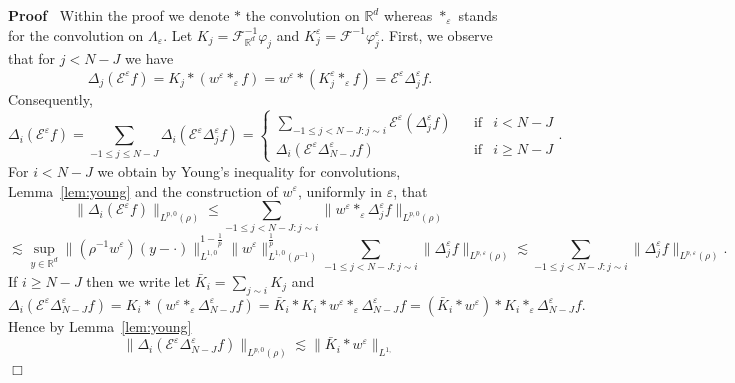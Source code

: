 \documentclass[a4paper,11pt]{article}
\newcommand{\cdummy}{\cdot}
\newcommand{\tmop}[1]{\ensuremath{\operatorname{#1}}}
\newenvironment{proof}{\noindent\textbf{Proof\ }}{\hspace*{\fill}$\Box$\medskip}
\numberwithin{equation}{section}
\begin{document}
\begin{proof}
  Within the proof we denote $\ast$ the convolution on $\mathbb{R}^d$ whereas
  $\ast_{\varepsilon}$ stands for the convolution on $\Lambda_{\varepsilon}$.
  Let $K_j = \mathcal{F}^{- 1}_{\mathbb{R}^d} \varphi_j$ and
  $K^{\varepsilon}_j = \mathcal{F}^{- 1} \varphi^{\varepsilon}_j$. First, we
  observe that for $j < N - J$ we have
  \[ \Delta_j (\mathcal{E}^{\varepsilon} f) = K_j \ast (w^{\varepsilon}
     \ast_{\varepsilon} f) = w^{\varepsilon} \ast (K^{\varepsilon}_j
     \ast_{\varepsilon} \mathcal{} \mathcal{} f) = \mathcal{E}^{\varepsilon}
     \Delta_j^{\varepsilon} f. \]
  Consequently,
  \[ \Delta_i (\mathcal{E}^{\varepsilon} f) = \sum_{- 1 \leqslant j \leqslant
     N - J} \Delta_i (\mathcal{E}^{\varepsilon} \Delta^{\varepsilon}_j f) =
     \left\{ \begin{array}{llll}
       \sum_{- 1 \leqslant j < N - J : j \sim i} \mathcal{E}^{\varepsilon}
       (\Delta^{\varepsilon}_j f) &  & \tmop{if} & i < N - J\\
       \Delta_i (\mathcal{E}^{\varepsilon} \Delta^{\varepsilon}_{N - J} f) & 
       & \tmop{if} & i \geqslant N - J
     \end{array} \right. . \]
  For $i < N - J$ we obtain by Young's inequality for convolutions, Lemma~\ref{lem:young} and the construction of $w^{\varepsilon}$,  uniformly in $\varepsilon$, that
  \[ \| \Delta_i (\mathcal{E}^{\varepsilon} f) \|_{L^{p, 0} (\rho)} \leqslant
     \sum_{- 1 \leqslant j < N - J : j \sim i} \| w^{\varepsilon}
     \ast_{\varepsilon} \Delta_j^{\varepsilon} f \|_{L^{p, 0} (\rho)} \]
  \[ \lesssim \sup_{y \in \mathbb{R}^d} \| (\rho^{- 1} w^{\varepsilon}) (y -
     \cdummy) \|^{1 - \frac{1}{p}}_{L^{1, 0}} \| w^{\varepsilon}
     \|^{\frac{1}{p}}_{L^{1, 0} (\rho^{- 1})} \sum_{- 1 \leqslant j < N - J :
     j \sim i} \| \Delta_j^{\varepsilon} f \|_{L^{p, \varepsilon} (\rho)}\lesssim \sum_{- 1 \leqslant j < N - J : j \sim i} \|
     \Delta^{\varepsilon}_j f \|_{L^{p, \varepsilon} (\rho)} .\]
 If $i \geqslant N - J$ then we write let
  $\bar{K}_i = \sum_{j \sim i} K_j$ and
  \[ \Delta_i (\mathcal{E}^{\varepsilon} \Delta^{\varepsilon}_{N - J} f) = K_i
     \ast (w^{\varepsilon} \ast_{\varepsilon} \Delta^{\varepsilon}_{N - J} f)
     = \bar{K}_i \ast K_i \ast w^{\varepsilon} \ast_{\varepsilon}
     \Delta^{\varepsilon}_{N - J} f = (\bar{K}_i \ast w^{\varepsilon}) \ast
     K_i \ast_{\varepsilon} \Delta^{\varepsilon}_{N - J} f. \]
  Hence by Lemma~\ref{lem:young}
  \[ \| \Delta_i (\mathcal{E}^{\varepsilon} \Delta^{\varepsilon}_{N - J} f)
     \|_{L^{p, 0} (\rho)} \lesssim \| \bar{K}_i \ast w^{\varepsilon} \|_{L^{1,
}}\]
\end{proof}
\end{document}
